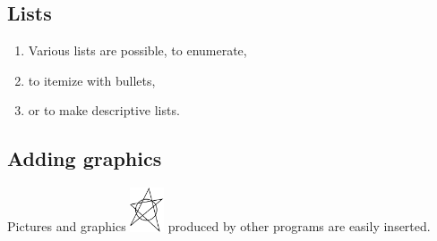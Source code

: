 \documentclass[a4paper,12pt]{article}
\begin{document}
\subsection{Lists}

\begin{enumerate}
\item Various lists are possible, to enumerate,
\item to itemize with bullets,
\item or to make descriptive lists.
\end{enumerate}

\subsection{Adding graphics}

Pictures and graphics
\includegraphics[width=1cm]{demo}
produced by other programs are easily inserted.
\end{document}

